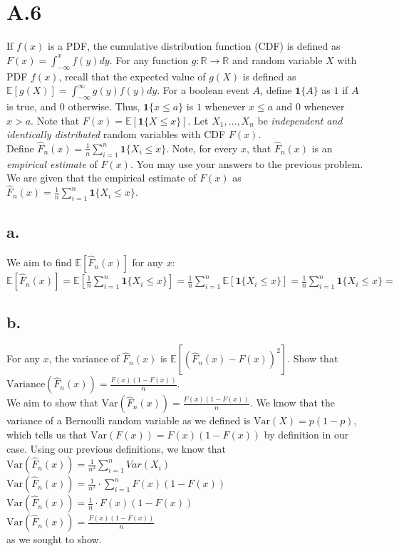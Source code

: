 \documentclass{article}
\newcommand{\field}[1]{\mathbb{#1}}
\newcommand{\1}{\mathbf{1}}
\newcommand{\E}{\mathbb{E}}
\newcommand{\R}{\field{R}} %
\begin{document}
\section*{A.6}
{\Large 

If $f(x)$ is a PDF, the cumulative distribution function (CDF)
  is  defined as $F(x) = \int_{-\infty}^x f(y) dy$.  For any function
  $g : \R \rightarrow \R$ and random variable $X$ with PDF $f(x)$,
  recall that the expected value of $g(X)$ is defined as
  $\E[g(X)] = \int_{-\infty}^\infty g(y) f(y) dy$. For a boolean event
  $A$, define $\1\{ A \}$ as $1$ if $A$ is true, and $0$
  otherwise. Thus, $\1\{ x \leq a \}$ is $1$ whenever $x \leq a$ and
  $0$ whenever $x > a$.  Note that $F(x) = \E[\1\{X \leq x\}]$.  Let
  $X_1,\dots,X_n$ be \emph{independent and identically distributed}
  random variables with CDF $F(x)$. \\ 
  Define
  $\widehat{F}_n(x) = \frac{1}{n} \sum_{i=1}^n \1\{X_i \leq
  x\}$. Note, for every $x$,
  that $\widehat{F}_n(x)$ is an \emph{empirical estimate} of  $F(x)$.
  You may use your answers to the previous problem. \\

We are given that the empirical estimate of $F(x)$ as $\widehat{F}_n(x) = \frac{1}{n} \sum_{i=1}^n \1\{X_i \leq x\}$.

\subsection*{a.}
We aim to find $\E[ \widehat{F}_n(x) ]$ for any $x$: \\
$\E[ \widehat{F}_n(x) ] = \E[\frac{1}{n} \sum_{i=1}^n \1\{X_i \leq x\}] = \frac{1}{n} \sum_{i=1}^n \E[\1\{X_i \leq x\}] = \frac{1}{n} \sum_{i=1}^n \1\{X_i \leq x\} = $ 

\subsection*{b.}
For any $x$, the variance of $\widehat{F}_n(x)$ is $\E[ ( \widehat{F}_n(x) - F(x) )^2 ]$.  Show that $\textrm{Variance}(\widehat{F}_n(x)) = \frac{F(x)(1-F(x))}{n}$. \\

We aim to show that $\textrm{Var}(\widehat{F}_n(x)) = \frac{F(x)(1-F(x))}{n}$. We know that the variance of a Bernoulli random variable as we defined is $\text{Var}(X) = p(1-p)$, which tells us that $\text{Var}(F(x)) = F(x)(1-F(x))$ by definition in our case. Using our previous definitions, we know that \\
$\textrm{Var}(\widehat{F}_n(x)) = \frac{1}{n^2} \sum_{i = 1}^{n} Var(X_i)$ \\
$\textrm{Var}(\widehat{F}_n(x)) = \frac{1}{n^2} \cdot \sum_{i = 1}^{n} F(x)(1-F(x))$ \\ 
$\textrm{Var}(\widehat{F}_n(x)) = \frac{1}{n} \cdot F(x)(1-F(x))$ \\ 
$\textrm{Var}(\widehat{F}_n(x)) = \frac{F(x)(1-F(x))}{n}$ \\
as we sought to show.

}
\end{document}

